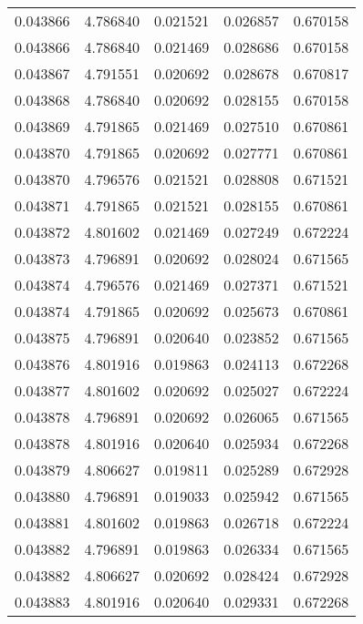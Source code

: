 \begin{tabular}{lrrrr}
0.043866    &  4.786840 &  0.021521 &  0.026857 &             0.670158 \\
0.043866    &  4.786840 &  0.021469 &  0.028686 &             0.670158 \\
0.043867    &  4.791551 &  0.020692 &  0.028678 &             0.670817 \\
0.043868    &  4.786840 &  0.020692 &  0.028155 &             0.670158 \\
0.043869    &  4.791865 &  0.021469 &  0.027510 &             0.670861 \\
0.043870    &  4.791865 &  0.020692 &  0.027771 &             0.670861 \\
0.043870    &  4.796576 &  0.021521 &  0.028808 &             0.671521 \\
0.043871    &  4.791865 &  0.021521 &  0.028155 &             0.670861 \\
0.043872    &  4.801602 &  0.021469 &  0.027249 &             0.672224 \\
0.043873    &  4.796891 &  0.020692 &  0.028024 &             0.671565 \\
0.043874    &  4.796576 &  0.021469 &  0.027371 &             0.671521 \\
0.043874    &  4.791865 &  0.020692 &  0.025673 &             0.670861 \\
0.043875    &  4.796891 &  0.020640 &  0.023852 &             0.671565 \\
0.043876    &  4.801916 &  0.019863 &  0.024113 &             0.672268 \\
0.043877    &  4.801602 &  0.020692 &  0.025027 &             0.672224 \\
0.043878    &  4.796891 &  0.020692 &  0.026065 &             0.671565 \\
0.043878    &  4.801916 &  0.020640 &  0.025934 &             0.672268 \\
0.043879    &  4.806627 &  0.019811 &  0.025289 &             0.672928 \\
0.043880    &  4.796891 &  0.019033 &  0.025942 &             0.671565 \\
0.043881    &  4.801602 &  0.019863 &  0.026718 &             0.672224 \\
0.043882    &  4.796891 &  0.019863 &  0.026334 &             0.671565 \\
0.043882    &  4.806627 &  0.020692 &  0.028424 &             0.672928 \\
0.043883    &  4.801916 &  0.020640 &  0.029331 &             0.672268 \\

\end{tabular}
